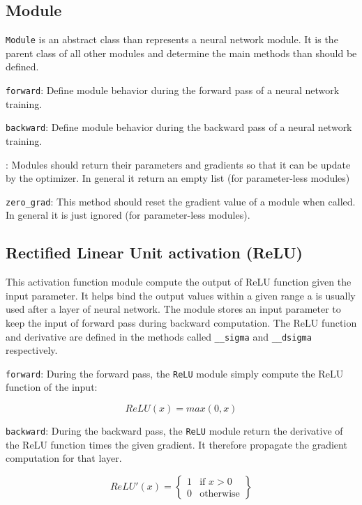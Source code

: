 \documentclass[10pt,conference,compsocconf]{IEEEtran}
\begin{document}
\subsection{Module}

\texttt{Module} is an abstract class than represents a neural network module. It is the parent class of all other modules and determine the main methods than should be defined. 

\texttt{forward}: Define module behavior during the forward pass of a neural network training.

\texttt{backward}: Define module behavior during the backward pass of a neural network training. 

: Modules should return their parameters and gradients so that it can be update by the optimizer. In general it return an empty list (for parameter-less modules)

\texttt{zero\_grad}: This method should reset the gradient value of a module when called. In general it is just ignored (for parameter-less modules).

\subsection{Rectified Linear Unit activation (ReLU)}

This activation function module compute the output of ReLU function given the input parameter. It helps bind the output values within a given range a is usually used after a layer of neural network. The module stores an input parameter to keep the input of forward pass during backward computation. The ReLU function and derivative are defined in the methods called \texttt{\_\_sigma} and \texttt{\_\_dsigma} respectively.

\texttt{forward}: During the forward pass, the \texttt{ReLU} module simply compute the ReLU function of the input:

\begin{equation}
   ReLU(x) = max(0, x) 
\end{equation}

\texttt{backward}: During the backward pass, the \texttt{ReLU} module return the derivative of the ReLU function times the given gradient. It therefore propagate the gradient computation for that layer. 

\begin{equation}
    ReLU'(x) = \left\{
    \begin{array}{lr}
        1 &  \textrm{if }x > 0\\
        0 & \textrm{otherwise}
    \end{array}\right\}
    
\end{equation}
\end{document}
